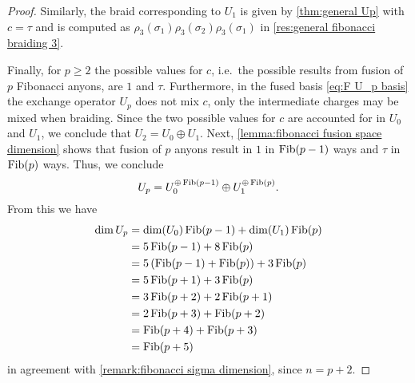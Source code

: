 \begin{proof}
  Similarly, the braid corresponding to $U_1$ is given by \cref{thm:general Up} with $c=τ$ and is computed as $ρ_3(σ_1) ρ_3(σ_2) ρ_3(σ_1)$ in \cref{res:general fibonacci braiding 3}.

  Finally, for $p \ge 2$ the possible values for $c$, i.e.\ the possible results from fusion of $p$ Fibonacci anyons, are $1$ and $τ$. Furthermore, in the fused basis \cref{eq:F U_p basis} the exchange operator $U_p$ does not mix $c$, only the intermediate charges may be mixed when braiding. Since the two possible values for $c$ are accounted for in $U_0$ and $U_1$, we conclude that $U_2 = U_0 \oplus U_1$. Next, \cref{lemma:fibonacci fusion space dimension} shows that fusion of $p$ anyons result in $1$ in $\operatorname{Fib}(p-1)$ ways and $τ$ in $\operatorname{Fib}(p)$ ways. Thus, we conclude
  \begin{equation}
    U_p = U_0^{\oplus\operatorname{Fib}(p-1)} \oplus U_1^{\oplus\operatorname{Fib}(p)}.
  \end{equation}
  From this we have
  \begin{equation}
    \begin{aligned}
      \dim U_p
      &= \dim(U_0) \operatorname{Fib}(p-1) + \dim(U_1) \operatorname{Fib}(p) \\
      &= 5 \operatorname{Fib}(p-1) + 8 \operatorname{Fib}(p) \\
      &= 5 \left(\operatorname{Fib}(p-1) + \operatorname{Fib}(p) \right) + 3 \operatorname{Fib}(p) \\
      &= 5 \operatorname{Fib}(p+1) + 3 \operatorname{Fib}(p) \\
      &= 3 \operatorname{Fib}(p+2) + 2 \operatorname{Fib}(p+1) \\
      &= 2 \operatorname{Fib}(p+3) + \operatorname{Fib}(p+2) \\
      &=   \operatorname{Fib}(p+4) + \operatorname{Fib}(p+3) \\
      &=   \operatorname{Fib}(p+5)
    \end{aligned}
  \end{equation}
  in agreement with \cref{remark:fibonacci sigma dimension}, since $n = p + 2$.



\end{proof}
